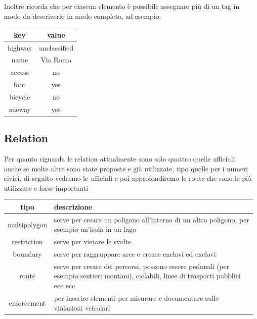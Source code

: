 \documentclass[a4paper,twoside,12pt,]{article}
\begin{document}
Inoltre ricorda che per ciascun elemento è possibile assegnare più di un tag in modo da descriverlo in modo completo, ad esempio:
\begin{center}
 \begin{tabular}{cc}
  \toprule
   \textbf{key} & \textbf{value} \\
  \midrule
   highway & unclassified \\
   name & Via Roma \\
   access & no \\
   foot & yes \\
   bicycle & no \\
   oneway & yes \\
  \bottomrule
 \end{tabular}
\end{center}
\subsection{Relation}
Per quanto riguarda le relation attualmente sono solo quattro quelle ufficiali anche se molte altre sono state proposte e già utilizzate, tipo quelle per i numeri civici, di seguito vedremo le ufficiali e poi approfondiremo le route che sono le più utilizzate e forse importanti
\begin{center}
 \begin{tabular}{c p{9cm}}
  \toprule
   \textbf{tipo} & \textbf{descrizione} \\
  \midrule
   multipolygon & serve per creare un poligono all'interno di un altro poligono, per esempio un'isola in un lago \\
   restriction	& serve per vietare le svolte \\
   boundary	& serve per raggruppare aree e creare enclavi ed exclavi \\
   route & serve per creare dei percorsi, possono essere pedonali (per esempio sentieri montani), ciclabili, linee di trasporti pubblici ecc ecc \\
   enforcement & per inserire elementi per misurare e documentare sulle violazioni veicolari \\
  \bottomrule
\end{tabular}
\end{center}
\end{document}
